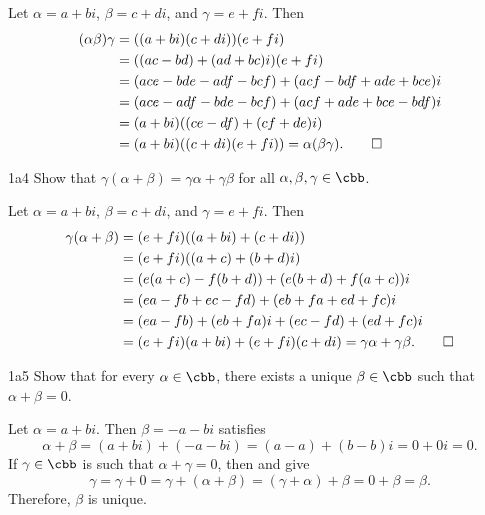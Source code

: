 \begin{sol}
    Let $\alpha = a + bi$, $\beta = c + di$, and $\gamma = e + fi$.
	Then
    \begin{align*}
        (\alpha\beta)\gamma & = ((a + bi)(c + di))(e + fi) \\
        & = ((ac - bd) + (ad + bc)i)(e + fi) \\
        & = (ace - bde - adf - bcf) + (acf - bdf + ade + bce)i \\
        & = (ace - adf - bde - bcf) + (acf + ade + bce - bdf)i \\
        & = (a + bi)((ce - df) + (cf + de)i) \\
        & = (a + bi)((c + di)(e + fi)) = \alpha(\beta\gamma). \qedhere
    \end{align*}
\end{sol}

\begin{exercise}{1a4}
    Show that $\gamma(\alpha + \beta) = \gamma\alpha + \gamma\beta$ for all $\alpha, \beta, \gamma \in \cbb$.
\end{exercise}

\begin{sol}
    Let $\alpha = a + bi$, $\beta = c + di$, and $\gamma = e + fi$.
	Then
    \begin{align*}
        \gamma(\alpha + \beta) & = (e + fi)((a + bi) + (c + di)) \\
        & = (e + fi)((a + c) + (b + d)i) \\
        & = (e(a + c) - f(b + d)) + (e(b + d) + f(a + c))i \\
        & = (ea - fb + ec - fd) + (eb + fa + ed + fc)i \\
        & = (ea - fb) + (eb + fa)i + (ec - fd) + (ed + fc)i \\
        & = (e + fi)(a + bi) + (e + fi)(c + di) = \gamma\alpha + \gamma\beta. \qedhere
    \end{align*}
\end{sol}

\begin{exercise}{1a5}
    Show that for every $\alpha \in \cbb$, there exists a unique $\beta \in \cbb$ such that $\alpha + \beta = 0$.
\end{exercise}

\begin{sol}
    Let $\alpha = a + bi$.
    Then $\beta = -a - bi$ satisfies
    \[
        \alpha + \beta = (a + bi) + (-a - bi) = (a - a) + (b - b)i = 0 + 0i = 0.
    \]
    If $\gamma \in \cbb$ is such that $\alpha + \gamma = 0$, then  and  give
    \[
        \gamma = \gamma + 0 = \gamma + (\alpha + \beta) = (\gamma + \alpha) + \beta = 0 + \beta = \beta.
    \]
    Therefore, $\beta$ is unique.
\end{sol}

